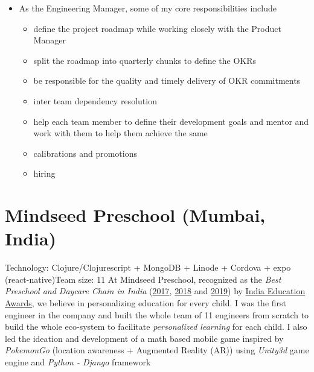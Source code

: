 \documentclass[11pt,a4paper,sans]{moderncv} %
\newcommand\Colorhref[3][blue]{\href{#2}{\small\color{#1}#3}}
\begin{document}
{\begin{itemize}
            \begin{itemize}
              \item Customer Referrals
              \item Incentivized actions (aka Gamification)
              \item Mystery box
            \end{itemize}
            \item As the Engineering Manager, some of my core responsibilities include
            \begin{itemize}
              \item define the project roadmap while working closely with the Product Manager
              \item split the roadmap into quarterly chunks to define the OKRs
              \item be responsible for the quality and timely delivery of OKR commitments
              \item inter team dependency resolution
              \item help each team member to define their development goals and mentor and work with them to help them achieve the same
              \item calibrations and promotions
              \item hiring
            \end{itemize}
          \end{itemize}}

\section{Mindseed Preschool (Mumbai, India)}
         {Technology: Clojure/Clojurescript + MongoDB + Linode + Cordova + expo (react-native)}{Team size: 11}
         {At Mindseed Preschool, recognized as the \textit{Best Preschool and Daycare Chain in India} (\Colorhref{http://epaperbeta.timesofindia.com/Article.aspx?eid=31804&articlexml=City-preschool-wins-top-honours-26022017105028}{2017}, \Colorhref{https://www.businesswireindia.com/actress-soha-ali-khan-felicitates-achievers-at-india-education-awards-2018-organised-by-blindwink-57760.html}{2018} and  \Colorhref{https://www.theindianwire.com/education/india-education-awards-2019-organised-blindwink-18th-aug-soha-ali-khan-presents-award-162277/}{2019}) by \Colorhref{https://indiaeducationawards.com/}{India Education Awards}, we believe in personalizing education for every child. I was the first engineer in the company and built the whole team of 11 engineers from scratch to build the whole eco-system to facilitate \textit{personalized learning} for each child. I also led the ideation and development of a math based mobile game inspired by \textit{PokemonGo} (location awareness + Augmented Reality (AR)) using \textit{Unity3d} game engine and \textit{Python - Django} framework}
\end{document}
